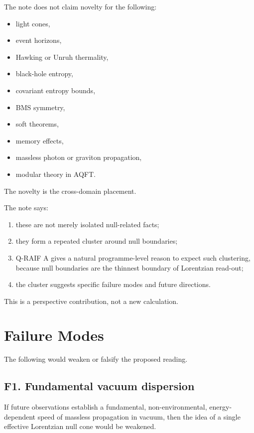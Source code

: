 \documentclass[12pt,a4paper]{article}
\theoremstyle{definition}
\theoremstyle{remark}
\newcommand{\tightlist}{%
  \setlength{\itemsep}{0pt}\setlength{\parskip}{0pt}}
\begin{document}
The note does not claim novelty for the following:

\begin{itemize}
\tightlist
\item
  light cones,
\item
  event horizons,
\item
  Hawking or Unruh thermality,
\item
  black-hole entropy,
\item
  covariant entropy bounds,
\item
  BMS symmetry,
\item
  soft theorems,
\item
  memory effects,
\item
  massless photon or graviton propagation,
\item
  modular theory in AQFT.
\end{itemize}

The novelty is the cross-domain placement.

The note says:

\begin{enumerate}[leftmargin=*]
\tightlist
\item
  these are not merely isolated null-related facts;
\item
  they form a repeated cluster around null boundaries;
\item
  Q-RAIF A gives a natural programme-level reason to expect such
  clustering, because null boundaries are the thinnest boundary of
  Lorentzian read-out;
\item
  the cluster suggests specific failure modes and future directions.
\end{enumerate}

This is a perspective contribution, not a new calculation.

\section{Failure Modes}\label{failure-modes}

The following would weaken or falsify the proposed reading.

\subsection{F1. Fundamental vacuum
dispersion}\label{f1.-fundamental-vacuum-dispersion}

If future observations establish a fundamental, non-environmental,
energy-dependent speed of massless propagation in vacuum, then the idea
of a single effective Lorentzian null cone would be weakened.
\end{document}
